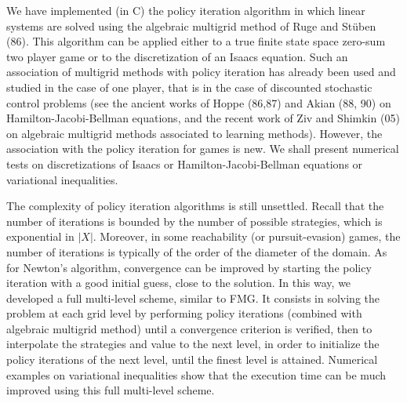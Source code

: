 \documentclass{report}
\begin{document}
We have implemented (in C) the policy iteration algorithm in which linear
systems are solved using the
algebraic multigrid method of Ruge and St\"uben (86).
This algorithm can be applied either to a true finite state space
zero-sum two player game or to the discretization of an Isaacs equation.
Such an association of multigrid methods with policy iteration has
already been used and studied in the case of one player, that is in the case
of discounted stochastic control problems (see the ancient works
of Hoppe (86,87) and Akian (88, 90) on Hamilton-Jacobi-Bellman equations,
and the recent work of Ziv and Shimkin (05)
on algebraic multigrid methods associated to learning methods).
However, the association with the policy iteration for games is new.
We shall present numerical tests
on discretizations of Isaacs or Hamilton-Jacobi-Bellman equations
or variational inequalities.

The complexity of policy iteration algorithms is still unsettled.
Recall that the number of iterations is bounded by the
number of possible strategies, which is exponential in $|X|$.
Moreover, in some reachability (or pursuit-evasion) games,
the number of iterations is typically of the order of the diameter of the
domain.
As for Newton's algorithm,
convergence can be improved by starting the
policy iteration with a good initial guess, close to
the solution. In this
way, we developed a full multi-level scheme, similar to FMG.
It consists in solving the problem at each grid level
by performing policy iterations (combined with algebraic multigrid method)
until a convergence criterion is verified,
then to interpolate the strategies and
value to the next level, in order to initialize the policy iterations
of the next level, until the finest level is attained.
Numerical examples on variational inequalities show that the execution time
can be much improved using this full multi-level scheme.
\end{document}
